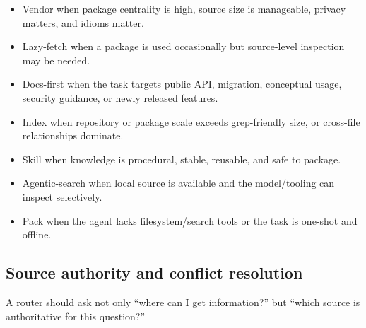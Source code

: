 \documentclass[
  11pt,
  letterpaper,
  numbers=noendperiod,
  parskip=half]{scrartcl}
\providecommand{\tightlist}{%
  \setlength{\itemsep}{0pt}\setlength{\parskip}{0pt}}
\begin{document}
\begin{itemize}
\tightlist
\item
  Vendor when package centrality is high, source size is manageable,
  privacy matters, and idioms matter.
\item
  Lazy-fetch when a package is used occasionally but source-level
  inspection may be needed.
\item
  Docs-first when the task targets public API, migration, conceptual
  usage, security guidance, or newly released features.
\item
  Index when repository or package scale exceeds grep-friendly size, or
  cross-file relationships dominate.
\item
  Skill when knowledge is procedural, stable, reusable, and safe to
  package.
\item
  Agentic-search when local source is available and the model/tooling
  can inspect selectively.
\item
  Pack when the agent lacks filesystem/search tools or the task is
  one-shot and offline.
\end{itemize}

\subsection{Source authority and conflict
resolution}\label{sec-authority}

A router should ask not only ``where can I get information?'' but
``which source is authoritative for this question?''
\end{document}
